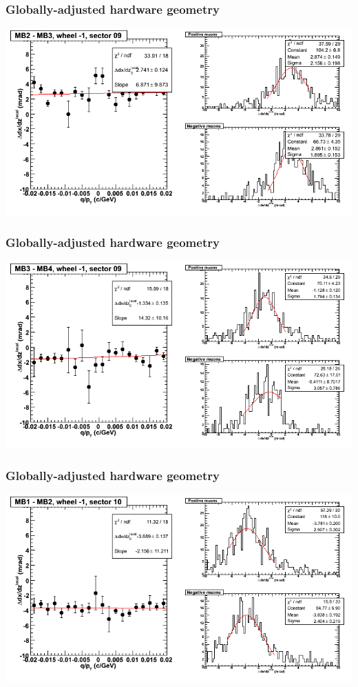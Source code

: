\documentclass[compress]{beamer}
\begin{document}
\begin{frame}
\frametitle{Globally-adjusted hardware geometry}
\includegraphics[width=\linewidth]{NOV4_segdiffs_HW/dt13_slope_B_09_23.png}
\end{frame}

\begin{frame}
\frametitle{Globally-adjusted hardware geometry}
\includegraphics[width=\linewidth]{NOV4_segdiffs_HW/dt13_slope_B_09_34.png}
\end{frame}

\begin{frame}
\frametitle{Globally-adjusted hardware geometry}
\includegraphics[width=\linewidth]{NOV4_segdiffs_HW/dt13_slope_B_10_12.png}
\end{frame}
\end{document}
